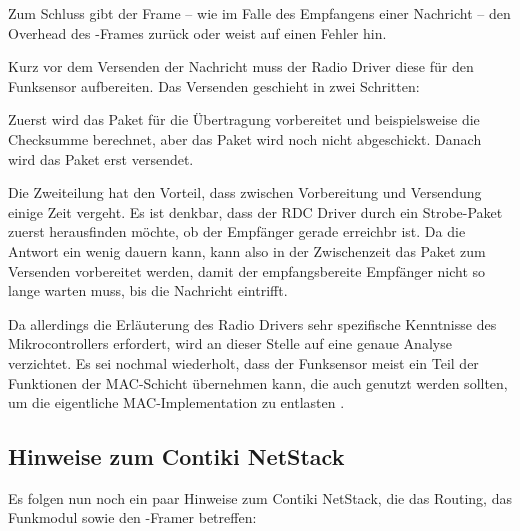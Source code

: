 \medskip

	Zum Schluss gibt der Frame -- wie im Falle des Empfangens einer
	Nachricht -- den Overhead des \ieeeframe-Frames zurück oder weist auf
	einen Fehler hin.


	Kurz vor dem Versenden der Nachricht muss der Radio Driver diese für
	den Funksensor aufbereiten. Das Versenden geschieht \idR in zwei
	Schritten:

	Zuerst wird das Paket für die Übertragung vorbereitet und
	beispielsweise die Checksumme berechnet, aber das Paket wird noch nicht
	abgeschickt.  Danach wird das Paket erst versendet.

	Die Zweiteilung hat den Vorteil, dass zwischen Vorbereitung und
	Versendung einige Zeit vergeht.  Es ist denkbar, dass der RDC Driver
	durch ein Strobe-Paket zuerst herausfinden möchte, ob der Empfänger
	gerade erreichbr ist.  Da die Antwort ein wenig dauern kann, kann also
	in der Zwischenzeit das Paket zum Versenden vorbereitet werden, damit
	der empfangsbereite Empfänger nicht so lange warten muss, bis die
	Nachricht eintrifft.

	Da allerdings die Erläuterung des Radio Drivers sehr spezifische
	Kenntnisse des Mikrocontrollers erfordert, wird an dieser Stelle auf
	eine genaue Analyse verzichtet. Es sei nochmal wiederholt, dass der
	Funksensor meist ein Teil der Funktionen der MAC-Schicht übernehmen
	kann, die auch genutzt werden sollten, um die eigentliche
	MAC-Implementation zu entlasten
	.

\subsection{Hinweise zum Contiki NetStack}
\label{sec:ContikiNetStack:Hinweise}

	Es folgen nun noch ein paar Hinweise zum Contiki NetStack, die das
	Routing, das Funkmodul sowie den \ieeeframe-Framer betreffen:

